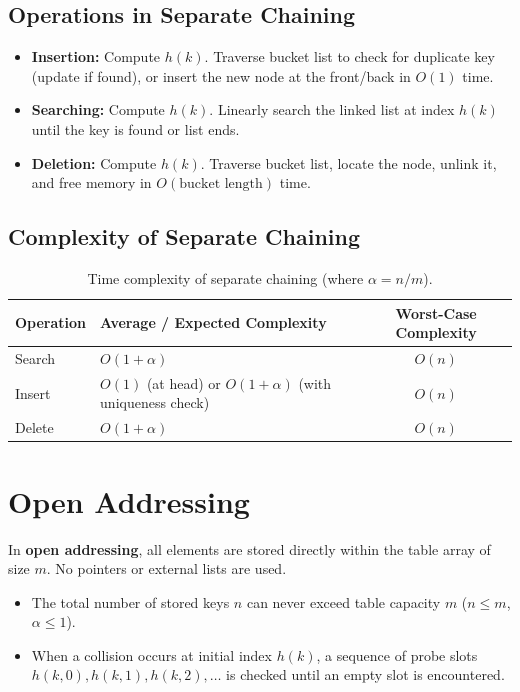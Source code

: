 \subsection{Operations in Separate Chaining}
\begin{itemize}
    \item \textbf{Insertion:} Compute $h(k)$. Traverse bucket list to check for duplicate key (update if found), or insert the new node at the front/back in $O(1)$ time.
    \item \textbf{Searching:} Compute $h(k)$. Linearly search the linked list at index $h(k)$ until the key is found or list ends.
    \item \textbf{Deletion:} Compute $h(k)$. Traverse bucket list, locate the node, unlink it, and free memory in $O(\text{bucket length})$ time.
\end{itemize}

\subsection{Complexity of Separate Chaining}

\begin{table}[htbp]
\centering
\small
\begin{tabularx}{\textwidth}{l X c}
\toprule
\textbf{Operation} & \textbf{Average / Expected Complexity} & \textbf{Worst-Case Complexity} \\
\midrule
Search & $O(1 + \alpha)$ & $O(n)$ \\
Insert & $O(1)$ (at head) or $O(1 + \alpha)$ (with uniqueness check) & $O(n)$ \\
Delete & $O(1 + \alpha)$ & $O(n)$ \\
\bottomrule
\end{tabularx}
\caption{Time complexity of separate chaining (where $\alpha = n / m$).}
\end{table}

\section{Open Addressing}

In \textbf{open addressing}, all elements are stored directly within the table array of size $m$. No pointers or external lists are used.
\begin{itemize}
    \item The total number of stored keys $n$ can never exceed table capacity $m$ ($n \leq m$, $\alpha \leq 1$).
    \item When a collision occurs at initial index $h(k)$, a sequence of probe slots $h(k, 0), h(k, 1), h(k, 2), \dots$ is checked until an empty slot is encountered.
\end{itemize}


